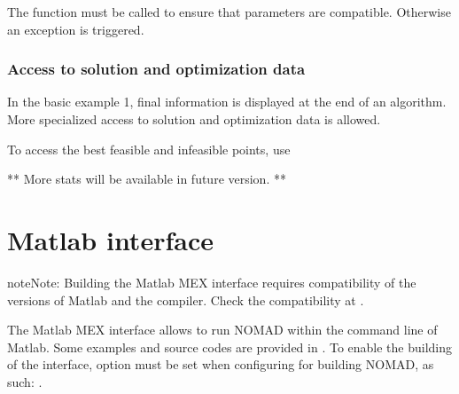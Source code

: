 \documentclass[letterpaper,10pt,english]{sphinxmanual}
\begin{document}
\begin{sphinxVerbatim}[commandchars=\\\{\}]

\end{sphinxVerbatim}

\sphinxAtStartPar
The  function must be called to ensure that parameters are compatible.
Otherwise an exception is triggered.


\subsection{Access to solution and optimization data}
\label{\detokenize{LibraryMode:access-to-solution-and-optimization-data}}
\sphinxAtStartPar
In the basic example 1, final information is displayed at the end of an algorithm. More specialized access to solution and optimization data is allowed.

\sphinxAtStartPar
To access the best feasible and infeasible points, use

\sphinxAtStartPar
{}

\sphinxAtStartPar
{}

\sphinxAtStartPar
** More stats will be available in future version. **


\chapter{Matlab interface}
\label{\detokenize{LibraryMode:matlab-interface}}
\begin{sphinxadmonition}{note}{Note:}
\sphinxAtStartPar
Building the Matlab MEX interface requires compatibility of the versions of Matlab and the compiler. Check the compatibility at .
\end{sphinxadmonition}

\sphinxAtStartPar
The Matlab MEX interface allows to run NOMAD within the command line of Matlab.
Some examples and source codes are provided in .
To enable the building of the interface, option  must be
set when configuring for building NOMAD, as such: .
\end{document}
